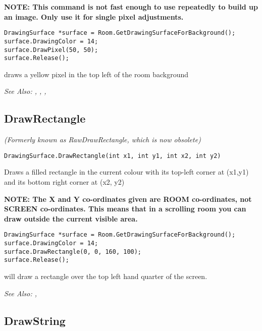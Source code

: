 \bf{NOTE:} This command is not fast enough to use repeatedly to build up an image. Only
use it for single pixel adjustments.

\begin{verbatim}
DrawingSurface *surface = Room.GetDrawingSurfaceForBackground();
surface.DrawingColor = 14;
surface.DrawPixel(50, 50);
surface.Release();
\end{verbatim}
draws a yellow pixel in the top left of the room background

\it{See Also:} ,
,
,


\subsection{DrawRectangle}\label{DrawingSurface.DrawRectangle}%

\it{(Formerly known as RawDrawRectangle, which is now obsolete)}

\begin{verbatim}
DrawingSurface.DrawRectangle(int x1, int y1, int x2, int y2)
\end{verbatim}
Draws a filled rectangle in the current colour with its top-left corner
at (x1,y1) and its bottom right corner at (x2, y2)

\bf{NOTE:} The X and Y co-ordinates given are ROOM co-ordinates, not SCREEN co-ordinates.
This means that in a scrolling room you can draw outside the current visible area.

\begin{verbatim}
DrawingSurface *surface = Room.GetDrawingSurfaceForBackground();
surface.DrawingColor = 14;
surface.DrawRectangle(0, 0, 160, 100);
surface.Release();
\end{verbatim}
will draw a rectangle over the top left hand quarter of the screen.

\it{See Also:} ,


\subsection{DrawString}\label{DrawingSurface.DrawString}%

